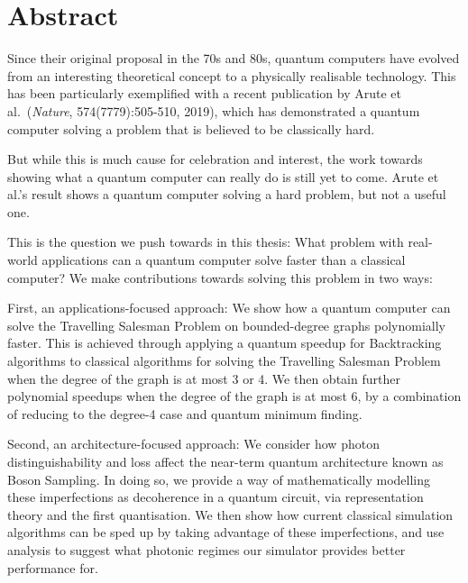 \chapter*{Abstract}

Since their original proposal in the 70s and 80s, quantum computers have evolved from an interesting theoretical concept to a physically realisable technology. This has been particularly exemplified with a recent publication by Arute et al.~(\emph{Nature}, 574(7779):505-510, 2019), which has demonstrated a quantum computer solving a problem that is believed to be classically hard.

But while this is much cause for celebration and interest, the work towards showing what a quantum computer can really do is still yet to come. Arute et al.'s result shows a quantum computer solving a hard problem, but not a useful one.

This is the question we push towards in this thesis: What problem with real-world applications can a quantum computer solve faster than a classical computer? We make contributions towards solving this problem in two ways:

First, an applications-focused approach: We show how a quantum computer can solve the Travelling Salesman Problem on bounded-degree graphs polynomially faster. This is achieved through applying a quantum speedup for Backtracking algorithms to classical algorithms for solving the Travelling Salesman Problem when the degree of the graph is at most 3 or 4. We then obtain further polynomial speedups when the degree of the graph is at most 6, by a combination of reducing to the degree-4 case and quantum minimum finding.

Second, an architecture-focused approach: We consider how photon distinguishability and loss affect the near-term quantum architecture known as Boson Sampling. In doing so, we provide a way of mathematically modelling these imperfections as decoherence in a quantum circuit, via representation theory and the first quantisation. We then show how current classical simulation algorithms can be sped up by taking advantage of these imperfections, and use analysis to suggest what photonic regimes our simulator provides better performance for.
